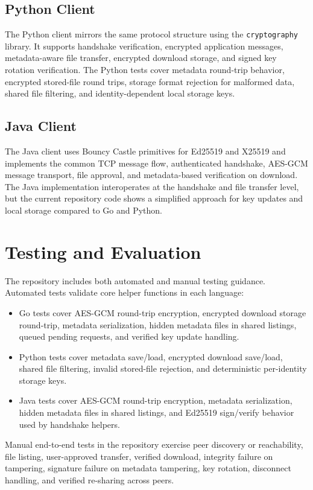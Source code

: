 \documentclass[sigconf,nonacm]{acmart}
\begin{document}
\subsection{Python Client}
The Python client mirrors the same protocol structure using the
\texttt{cryptography} library. It supports handshake verification,
encrypted application messages, metadata-aware file transfer, encrypted
download storage, and signed key rotation verification. The Python tests
cover metadata round-trip behavior, encrypted stored-file round trips,
storage format rejection for malformed data, shared file filtering, and
identity-dependent local storage keys.

\subsection{Java Client}
The Java client uses Bouncy Castle primitives for Ed25519 and X25519 and
implements the common TCP message flow, authenticated handshake, AES-GCM
message transport, file approval, and metadata-based verification on
download. The Java implementation interoperates at the handshake and file
transfer level, but the current repository code shows a simplified
approach for key updates and local storage compared to Go and Python.

\section{Testing and Evaluation}
The repository includes both automated and manual testing guidance.
Automated tests validate core helper functions in each language:
\begin{itemize}
\item Go tests cover AES-GCM round-trip encryption, encrypted download
storage round-trip, metadata serialization, hidden metadata files in
shared listings, queued pending requests, and verified key update
handling.
\item Python tests cover metadata save/load, encrypted download
save/load, shared file filtering, invalid stored-file rejection, and
deterministic per-identity storage keys.
\item Java tests cover AES-GCM round-trip encryption, metadata
serialization, hidden metadata files in shared listings, and Ed25519
sign/verify behavior used by handshake helpers.
\end{itemize}

Manual end-to-end tests in the repository exercise peer discovery or
reachability, file listing, user-approved transfer, verified download,
integrity failure on tampering, signature failure on metadata tampering,
key rotation, disconnect handling, and verified re-sharing across peers.
\end{document}
